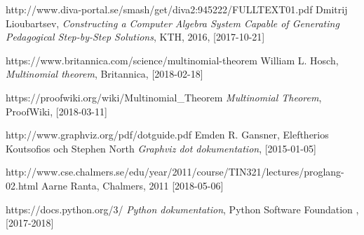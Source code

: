 \documentclass[12pt,a4paper]{article}
\begin{document}
\begin{thebibliography}{9}

  http://www.diva-portal.se/smash/get/diva2:945222/FULLTEXT01.pdf
  Dmitrij Lioubartsev,
  \textit{Constructing a Computer Algebra System Capable of Generating Pedagogical Step-by-Step Solutions},
  KTH,
  2016,
  [2017-10-21]

  https://www.britannica.com/science/multinomial-theorem
  William L. Hosch,
  \textit{Multinomial theorem},
  Britannica,
  [2018-02-18]

  https://proofwiki.org/wiki/Multinomial\_Theorem
  \textit{Multinomial Theorem},
  ProofWiki,
  [2018-03-11]

  http://www.graphviz.org/pdf/dotguide.pdf
  Emden R. Gansner, Eleftherios Koutsofios och Stephen North
  \textit{Graphviz dot dokumentation},
  [2015-01-05]

  http://www.cse.chalmers.se/edu/year/2011/course/TIN321/lectures/proglang-02.html
  Aarne Ranta,
  Chalmers,
  2011
  [2018-05-06]

  https://docs.python.org/3/
  \textit{Python dokumentation},
  Python Software Foundation ,
  [2017-2018] 
\end{thebibliography}
\newpage
\end{document}
